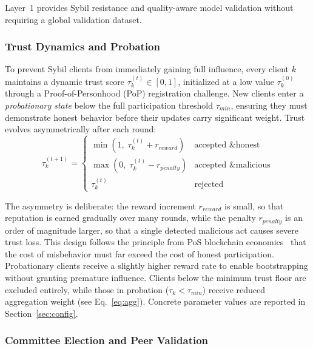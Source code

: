 \documentclass[conference]{IEEEtran}
\begin{document}
Layer~1 provides Sybil resistance and quality-aware model validation without requiring a global validation dataset.

\subsubsection{Trust Dynamics and Probation}

To prevent Sybil clients from immediately gaining full influence, every client $k$ maintains a dynamic trust score $\tau_k^{(t)} \in [0, 1]$, initialized at a low value $\tau_k^{(0)}$ through a Proof-of-Personhood (PoP) registration challenge. New clients enter a \emph{probationary state} below the full participation threshold $\tau_{min}$, ensuring they must demonstrate honest behavior before their updates carry significant weight. Trust evolves asymmetrically after each round:
\begin{equation}
\tau_k^{(t+1)} = 
\begin{cases} 
\min(1,\; \tau_k^{(t)} + r_{reward}) & \text{accepted \& honest} \\
\max(0,\; \tau_k^{(t)} - r_{penalty}) & \text{accepted \& malicious} \\
\tau_k^{(t)} & \text{rejected}
\end{cases}
\label{eq:trust}
\end{equation}

The asymmetry is deliberate: the reward increment $r_{reward}$ is small, so that reputation is earned gradually over many rounds, while the penalty $r_{penalty}$ is an order of magnitude larger, so that a single detected malicious act causes severe trust loss. This design follows the principle from PoS blockchain economics~\cite{buterin2019casper} that the cost of misbehavior must far exceed the cost of honest participation. Probationary clients receive a slightly higher reward rate to enable bootstrapping without granting premature influence. Clients below the minimum trust floor are excluded entirely, while those in probation ($\tau_k < \tau_{min}$) receive reduced aggregation weight (see Eq.~\ref{eq:agg}). Concrete parameter values are reported in Section~\ref{sec:config}.

\subsubsection{Committee Election and Peer Validation}
\end{document}
